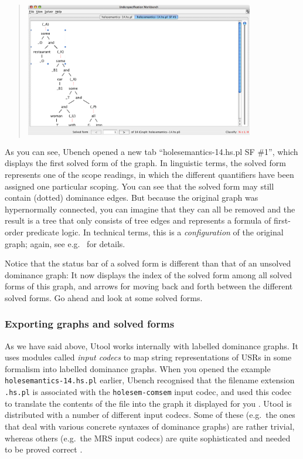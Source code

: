 \begin{quotation}
\includegraphics[width=10cm]{ubench-holesem-sf.png}
\end{quotation}

As you can see, Ubench opened a new tab ``holesemantics-14.hs.pl SF \#1'', which displays the first solved form of the graph. In linguistic terms, the solved form represents one of the scope readings, in which the different quantifiers have been assigned one particular scoping. You can see that the solved form may still contain (dotted) dominance edges. But because the original graph was hypernormally connected, you can imagine that they can all be removed and the result is a tree that only consists of tree edges and represents a formula of first-order predicate logic. In technical terms, this is a \emph{configuration} of the original graph; again, see e.g.\  for details.

Notice that the status bar of a solved form is different than that of an unsolved dominance graph: It now displays the index of the solved form among all solved forms of this graph, and arrows for moving back and forth between the different solved forms. Go ahead and look at some solved forms.



\subsubsection{Exporting graphs and solved forms}

As we have said above, Utool works internally with labelled dominance graphs. It uses modules called \emph{input codecs} to map string representations of USRs in some formalism into labelled dominance graphs. When you opened the example \verb?holesemantics-14.hs.pl? earlier, Ubench recognised that the filename extension \verb?.hs.pl? is associated with the \verb?holesem-comsem? input codec, and used this codec to translate the contents of the file into the graph it displayed for you \cite{KolNieTha03}. Utool is distributed with a number of different input codecs. Some of these (e.g.\ the ones that deal with various concrete syntaxes of dominance graphs) are rather trivial, whereas others (e.g.\ the MRS input codecs) are quite sophisticated and needed to be proved correct \cite{FucKolNieTha04}.

